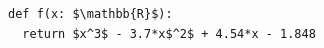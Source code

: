 \documentclass[border=10pt]{standalone}
\begin{document}
\begin{lstlisting}
def f(x: $\mathbb{R}$):
  return $x^3$ - 3.7*x$^2$ + 4.54*x - 1.848
\end{lstlisting}
\end{document}
